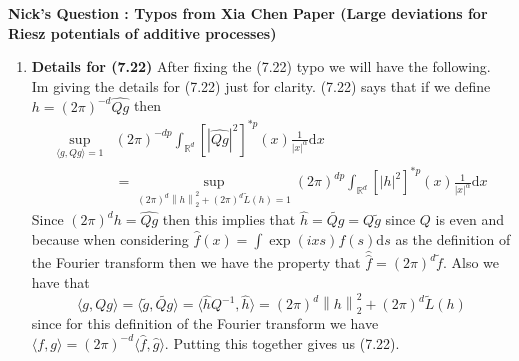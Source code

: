 \documentclass[a4paper,11pt]{article}
\numberwithin{equation}{section}
\theoremstyle{plain}
\theoremstyle{definition}
\newcommand{\ud}{\ensuremath{\mathrm{d} }}
\newcommand{\Norm}[1]{\left\|  #1   \right\|}
\newcommand{\calF}{\mathcal{F}}
\newcommand{\R}{\mathbb{R}}
\newcounter{NQ}
\newenvironment{NickQuestion}[1][] %
{\refstepcounter{NQ}
	\begin{mdframed}[backgroundcolor=lightgray]\textbf{Nick's Question \theNQ \: #1~~}~~~\noindent}%
	{\end{mdframed}}
\numberwithin{NQ}{section}
\numberwithin{LQ}{section}
\numberwithin{ZQ}{section}
\begin{document}
\begin{NickQuestion}[ : Typos from Xia Chen Paper (Large deviations for Riesz potentials of additive processes) ]
\begin{enumerate}
			\textcolor{magenta}{Xia's arguments are correct:
				\begin{align*}
				\calF \left( f * \widetilde{f} \right)(\xi) = \calF(f)(\xi) \calF(\widetilde{f} )(\xi)
				=\calF(f)(\xi) \overline{\calF(f)(\xi)}  = \left|\calF(f)(\xi)\right|^2.
				\end{align*}}

			It seems as if they are assuming that $\widehat{\widetilde{Qg}} = \widehat{Qg}$ which is only true if $Qg$ is an even function.

			\textbf{Nicks Solution:}
			Since $Qg$ is a real valued function then we have the property that
			\[
			\widehat{\widetilde{Qg}} = \overline{\widehat{Qg}}
			\]
			and therefore we have that
			\[
			\int_{\R^d}  \bigg[ \widehat{Qg}\;\widehat{\widetilde{Qg}} \bigg] ^{*p}(x)\mathcal{F}\varphi(x) \ud x = \int_{\R^d}  \bigg[ |\widehat{Qg}|^2 \bigg] ^{*p}(x)\mathcal{F}\varphi(x) \ud x
			\]
			which verifies equation (7.22).
			\item \textbf{Details for (7.22)} After fixing the (7.22) typo we will have the following. Im giving the details for (7.22) just for clarity. (7.22) says that if we define $h=(2\pi)^{-d}\widehat{Qg}$ then
			\begin{align*}
			\sup_{\langle g, Qg \rangle =1} &	(2\pi)^{-dp} \int_{\R^d} [ |\widehat{Qg}|^2 ]^{*p}(x) \frac{1}{|x|^\alpha} \ud x
			\\&= \sup_{(2\pi)^d \Norm{h}_2^2 + (2\pi)^d \tilde{L}(h) =1} 	(2\pi)^{dp} \int_{\R^d} [ |h|^2 ]^{*p}(x) \frac{1}{|x|^\alpha} \ud x
			\end{align*}
			Since $(2\pi)^{d}h=\widehat{Qg}$ then this implies that $\hat{h} = \widetilde{Qg} = Q\tilde{g}$
			since $Q$ is even and because when considering $\hat{f}(x) = \int \exp(ixs)f(s) \ud s$ as the
			definition of the Fourier transform then we have the property that $\hat{\hat{f}} =
			(2\pi)^d\tilde{f}$. Also we have that
			\[
			\langle g, Qg \rangle = \langle \tilde{g}, \widetilde{Qg} \rangle = \langle  \hat{h}Q^{-1}, \hat{h} \rangle = (2\pi)^d\Norm{h}_2^2 + (2\pi)^d\tilde{L}(h)
			\]
			since for this definition of the Fourier transform we have $\langle f , g  \rangle =
			(2\pi)^{-d}\langle \hat{f} , \hat{g} \rangle$. Putting this together gives us (7.22).



\end{enumerate}
\end{NickQuestion}
\end{document}
